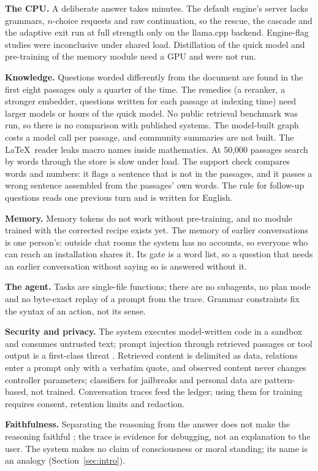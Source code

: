 \textbf{The CPU.} A deliberate answer takes minutes. The default engine's
server lacks grammars, $n$-choice requests and raw continuation, so the
rescue, the cascade and the adaptive exit run at full strength only on the
llama.cpp backend. Engine-flag studies were inconclusive under shared load.
Distillation of the quick model and pre-training of the memory module need a
GPU and were not run.

\textbf{Knowledge.} Questions worded differently from the document are found
in the first eight passages only a quarter of the time. The remedies
(a reranker, a stronger embedder, questions written for each passage at
indexing time) need larger models or hours of the quick model. No public
retrieval benchmark was run, so there is no comparison with published
systems. The model-built graph costs a model call per passage, and community
summaries are not built. The \LaTeX\ reader leaks macro names inside
mathematics. At 50{,}000 passages search by words through the store is slow
under load. The support check compares words and numbers: it flags a sentence
that is not in the passages, and it passes a wrong sentence assembled from
the passages' own words. The rule for follow-up questions reads one previous
turn and is written for English.

\textbf{Memory.} Memory tokens do not work without pre-training, and no
module trained with the corrected recipe exists yet. The memory of earlier
conversations is one person's: outside chat rooms the system has no accounts,
so everyone who can reach an installation shares it. Its gate is a word list,
so a question that needs an earlier conversation without saying so is
answered without it.

\textbf{The agent.} Tasks are single-file functions; there are no subagents,
no plan mode and no byte-exact replay of a prompt from the trace. Grammar
constraints fix the syntax of an action, not its sense.

\textbf{Security and privacy.} The system executes model-written code in a
sandbox and consumes untrusted text; prompt injection through retrieved
passages or tool output is a first-class threat
\cite{greshake2023injection,perez2022ignore}. Retrieved content is delimited
as data, relations enter a prompt only with a verbatim quote, and observed
content never changes controller parameters; classifiers for jailbreaks and
personal data are pattern-based, not trained. Conversation traces feed the
ledger; using them for training requires consent, retention limits and
redaction.

\textbf{Faithfulness.} Separating the reasoning from the answer does not make
the reasoning faithful \cite{turpin2023unfaithful,ji2023hallucination}; the
trace is evidence for debugging, not an explanation to the user. The system
makes no claim of consciousness or moral standing; its name is an analogy
(Section~\ref{sec:intro}).
